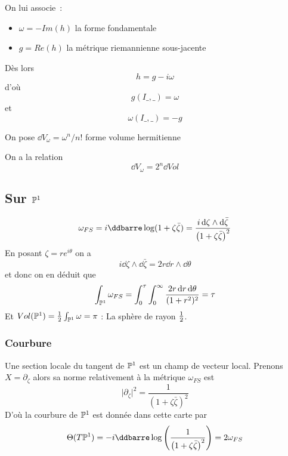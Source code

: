\documentclass[12pt,makeidx]{amsart}
\begin{document}
On lui associe~:
\begin{itemize}
\item $\omega = - Im(h)$ la forme fondamentale \cite{Demailly}
\item $g = Re(h)$ la métrique riemannienne sous-jacente
\end{itemize}
Dès lors
\begin{equation}
h = g - i \omega
\end{equation}
d'où
\begin{equation}
g(I\_,\_) = \omega
\end{equation}
et
\begin{equation}
\omega(I\_,\_) = -g
\end{equation}

On pose $\dd V_\omega = \omega^n/n!$ forme volume hermitienne \cite{Demailly}

On a la relation
\begin{equation}\label{VolumeRiemannHermit}
\dd V_{\omega} = 2^n \dd Vol
\end{equation}

\subsection{Sur $\mathbb{P}^1$}
\[
\omega_{FS} = i\ddbarre \log (1+\zeta\bar\zeta) = \dfrac{i\dd \zeta \wedge \dd \bar\zeta}{\left(1+\zeta\bar\zeta\right)^2}
\]
En posant $\zeta = re^{i\theta}$ on a 
\[
i\dd \zeta \wedge \dd \bar\zeta = 2r \dd r \wedge \dd \theta
\]
et donc on en déduit que
\[
\int_{\mathbb{P}^1} \omega_{FS} = \int_0^\tau \int_0^\infty \dfrac{2r \operatorname{d\!} r \operatorname{d\!} \theta}{(1+r^2)^2}
= \tau
\]
Et $Vol(\mathbb{P}^1) = \operatorname{\frac{1}{2}}\int_{\mathbb{P}^1} \omega = \pi$ : La sphère de rayon $\operatorname{\frac{1}{2}}$.

\subsubsection{Courbure} Une section locale du tangent de $\mathbb{P}^1$ est un champ de vecteur local. Prenons $X = \partial_\zeta$ alors sa norme relativement à la métrique $\omega_{FS}$ est 
\[
\vert \partial_\zeta \vert^2 = \dfrac{1}{\left(1+\zeta\bar\zeta\right)^2}
\]
D'où la courbure de $\mathbb{P}^1$ est donnée dans cette carte par
\[
\Theta(T\Pro^1) = -i\ddbarre \log \left(\dfrac{1}{\left(1+\zeta\bar\zeta\right)^2}\right) = 2 \omega_{FS}
\]

\appendix
\printindex
\end{document}
